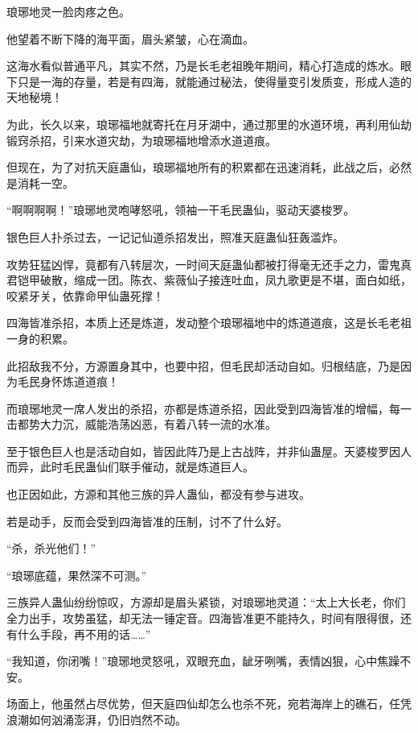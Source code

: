 
\begin{this_body}

琅琊地灵一脸肉疼之色。

他望着不断下降的海平面，眉头紧皱，心在滴血。

这海水看似普通平凡，其实不然，乃是长毛老祖晚年期间，精心打造成的炼水。眼下只是一海的存量，若是有四海，就能通过秘法，使得量变引发质变，形成人造的天地秘境！

为此，长久以来，琅琊福地就寄托在月牙湖中，通过那里的水道环境，再利用仙劫锻窍杀招，引来水道灾劫，为琅琊福地增添水道道痕。

但现在，为了对抗天庭蛊仙，琅琊福地所有的积累都在迅速消耗，此战之后，必然是消耗一空。

“啊啊啊啊！”琅琊地灵咆哮怒吼，领袖一干毛民蛊仙，驱动天婆梭罗。

银色巨人扑杀过去，一记记仙道杀招发出，照准天庭蛊仙狂轰滥炸。

攻势狂猛凶悍，竟都有八转层次，一时间天庭蛊仙都被打得毫无还手之力，雷鬼真君铠甲破散，缩成一团。陈衣、紫薇仙子接连吐血，凤九歌更是不堪，面白如纸，咬紧牙关，依靠命甲仙蛊死撑！

四海皆准杀招，本质上还是炼道，发动整个琅琊福地中的炼道道痕，这是长毛老祖一身的积累。

此招敌我不分，方源置身其中，也要中招，但毛民却活动自如。归根结底，乃是因为毛民身怀炼道道痕！

而琅琊地灵一席人发出的杀招，亦都是炼道杀招，因此受到四海皆准的增幅，每一击都势大力沉，威能浩荡凶恶，有着八转一流的水准。

至于银色巨人也是活动自如，皆因此阵乃是上古战阵，并非仙蛊屋。天婆梭罗因人而异，此时毛民蛊仙们联手催动，就是炼道巨人。

也正因如此，方源和其他三族的异人蛊仙，都没有参与进攻。

若是动手，反而会受到四海皆准的压制，讨不了什么好。

“杀，杀光他们！”

“琅琊底蕴，果然深不可测。”

三族异人蛊仙纷纷惊叹，方源却是眉头紧锁，对琅琊地灵道：“太上大长老，你们全力出手，攻势虽猛，却无法一锤定音。四海皆准更不能持久，时间有限得很，还有什么手段，再不用的话……”

“我知道，你闭嘴！”琅琊地灵怒吼，双眼充血，龇牙咧嘴，表情凶狠，心中焦躁不安。

场面上，他虽然占尽优势，但天庭四仙却怎么也杀不死，宛若海岸上的礁石，任凭浪潮如何汹涌澎湃，仍旧岿然不动。


\end{this_body}
